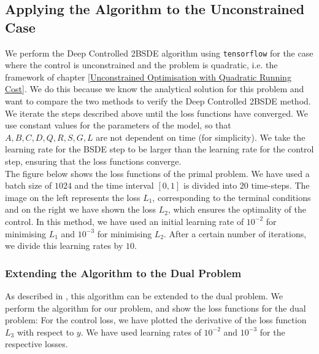 \subsection{Applying the Algorithm to the Unconstrained Case}
We perform the Deep Controlled 2BSDE algorithm using \verb|tensorflow| for the case where the control is unconstrained and the problem is quadratic, i.e. the framework of chapter \ref{Unconstrained Optimisation with Quadratic Running Cost}. We do this because we know the analytical solution for this problem and want to compare the two methods to verify the Deep Controlled 2BSDE method. \\

We iterate the steps described above until the loss functions have converged. We use constant values for the parameters of the model, so that $A, B, C, D, Q ,R, S, G, L$ are not dependent on time (for simplicity). We take the learning rate for the BSDE step to be larger than the learning rate for the control step, ensuring that the loss functions converge. \\

The figure below shows the loss functions of the primal problem. We have used a batch size of $1024$ and the time interval $[0, 1]$ is divided into $20$ time-steps. 
The image on the left represents the loss $L_1$, corresponding to the terminal conditions and on the right we have shown the loss $L_2$, which ensures the optimality of the control. In this method, we have used an initial learning rate of $10^{-2}$ for minimising $L_1$ and $10^{-3}$ for minimising $L_2$. After a certain number of iterations, we divide this learning rates by $10$.\\


    

\subsubsection*{Extending the Algorithm to the Dual Problem}
As described in \cite{Deep_Learning_for_Constrained_Utility_Maximisation}, this algorithm can be extended to the dual problem. We perform the algorithm for our problem, and show the loss functions for the dual problem:
For the control loss, we have plotted the derivative of the loss function $L_3$ with respect to $y$. We have used learning rates of $10^{-2}$ and $10^{-3}$ for the respective losses. \\

